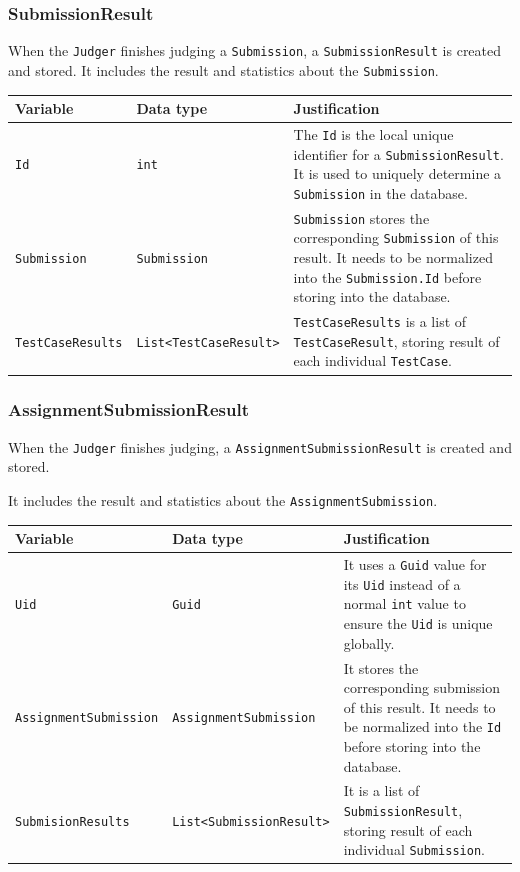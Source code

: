 \documentclass[a4paper]{report}
\begin{document}
\subsubsection{SubmissionResult}

When the \verb|Judger| finishes judging a \verb|Submission|, a \verb|SubmissionResult| is created and stored. It includes the result and statistics about the \verb|Submission|.

\begin{tabulary}{\textwidth}{|l|l|L|}
    \hline
    Variable & Data type & Justification \\
    \hline
    \verb|Id| & \verb|int| & The \verb|Id| is the local unique identifier for a \verb|SubmissionResult|. It is used to uniquely determine a \verb|Submission| in the database.\\
    \hline
    \verb|Submission| & \verb|Submission| & \verb|Submission| stores the corresponding \verb|Submission| of this result. It needs to be normalized into the \verb|Submission.Id| before storing into the database. \\
    \hline
    \verb|TestCaseResults| & \verb|List<TestCaseResult>| & \verb|TestCaseResults| is a list of \verb|TestCaseResult|, storing result of each individual \verb|TestCase|. \\
    \hline
 \end{tabulary}

\subsubsection{AssignmentSubmissionResult}

When the \verb|Judger| finishes judging, a \verb|AssignmentSubmissionResult| is created and stored.

It includes the result and statistics about the \verb|AssignmentSubmission|.

\begin{tabulary}{\textwidth}{|l|l|L|}
    \hline
    Variable & Data type & Justification \\
    \hline
    \verb|Uid| & \verb|Guid| & It uses a \verb|Guid| value for its \verb|Uid| instead of a normal \verb|int| value to ensure the \verb|Uid| is unique globally. \\
    \hline
    \verb|AssignmentSubmission| & \verb|AssignmentSubmission| & It stores the corresponding submission of this result. It needs to be normalized into the \verb|Id| before storing into the database. \\
    \hline
    \verb|SubmisionResults| & \verb|List<SubmissionResult>| & It is a list of \verb|SubmissionResult|, storing result of each individual \verb|Submission|. \\
    \hline
\end{tabulary}
\end{document}
